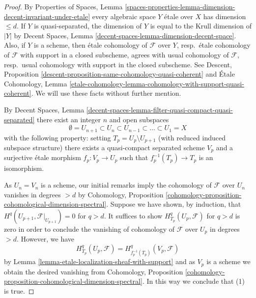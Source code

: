 \documentclass[10pt,a4paper]{amsart}
\theoremstyle{plain}
\theoremstyle{definition}
\theoremstyle{remark}
\numberwithin{equation}{subsection}
\begin{document}
\begin{proof}
By Properties of Spaces, Lemma
\ref{spaces-properties-lemma-dimension-decent-invariant-under-etale}
every algebraic space $Y$ \'etale over $X$ has dimension $\leq d$.
If $Y$ is quasi-separated, the dimension of $Y$ is equal to the
Krull dimension of $|Y|$ by 
Decent Spaces, Lemma \ref{decent-spaces-lemma-dimension-decent-space}.
Also, if $Y$ is a scheme, then \'etale cohomology of $\mathcal{F}$
over $Y$, resp.\ \'etale cohomology of $\mathcal{F}$ with support in a
closed subscheme, agrees with usual cohomology of $\mathcal{F}$,
resp.\ usual cohomology with support in the closed subscheme.
See
Descent, Proposition \ref{descent-proposition-same-cohomology-quasi-coherent}
and
\'Etale Cohomology, Lemma
\ref{etale-cohomology-lemma-cohomology-with-support-quasi-coherent}.
We will use these facts without further mention.

\medskip\noindent
By Decent Spaces, Lemma
\ref{decent-spaces-lemma-filter-quasi-compact-quasi-separated}
there exist an integer $n$ and open subspaces
$$
\emptyset = U_{n + 1} \subset
U_n \subset U_{n - 1} \subset \ldots \subset U_1 = X
$$
with the following property: setting $T_p = U_p \setminus U_{p + 1}$
(with reduced induced subspace structure) there exists a quasi-compact
separated scheme $V_p$ and a surjective \'etale morphism $f_p : V_p \to U_p$
such that $f_p^{-1}(T_p) \to T_p$ is an isomorphism.

\medskip\noindent
As $U_n = V_n$ is a scheme, our initial remarks imply the cohomology of
$\mathcal{F}$ over $U_n$ vanishes in degrees $> d$ by
Cohomology, Proposition
\ref{cohomology-proposition-cohomological-dimension-spectral}.
Suppose we have shown, by induction, that
$H^q(U_{p + 1}, \mathcal{F}|_{U_{p + 1}}) = 0$ for $q > d$.
It suffices to show $H_{T_p}^q(U_p, \mathcal{F})$ for
$q > d$ is zero in order to conclude the vanishing of cohomology
of $\mathcal{F}$ over $U_p$ in degrees $> d$.
However, we have
$$
H^q_{T_p}(U_p, \mathcal{F}) = H^q_{f_p^{-1}(T_p)}(V_p, \mathcal{F})
$$
by Lemma \ref{lemma-etale-localization-sheaf-with-support}
and as $V_p$ is a scheme we obtain the desired vanishing from
Cohomology, Proposition
\ref{cohomology-proposition-cohomological-dimension-spectral}.
In this way we conclude that (1) is true.


\end{proof}
\end{document}
